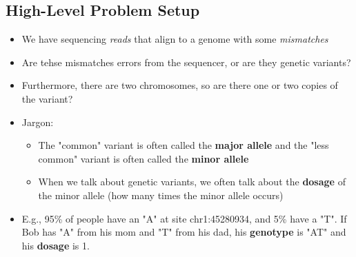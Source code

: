 \documentclass[10pt]{article}
\begin{document}
\subsection*{High-Level Problem Setup}
\begin{itemize}
    \item We have sequencing \textit{reads} that align to a genome with some \textit{mismatches}
    \item Are tehse mismatches errors from the sequencer, or are they genetic variants?
    \item Furthermore, there are two chromosomes, so are there one or two copies of the variant?
    \item Jargon:
    \begin{itemize}
        \item The "common" variant is often called the \textbf{major allele} and the "less common" variant is often called the \textbf{minor allele}
        \item When we talk about genetic variants, we often talk about the \textbf{dosage} of the minor allele (how many times the minor allele occurs)
    \end{itemize}
    \item E.g., 95\% of people have an "A" at site chr1:45280934, and 5\% have a "T".  If Bob has "A" from his mom and "T" from his dad, his \textbf{genotype} is "AT" and his \textbf{dosage} is 1.
\end{itemize}
\end{document}
